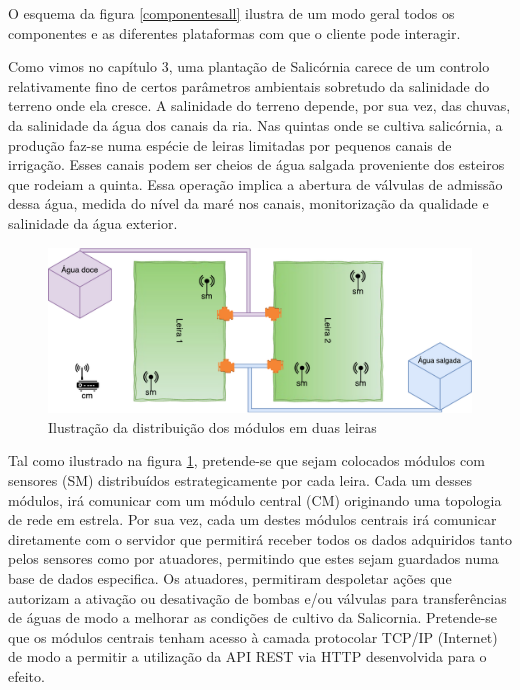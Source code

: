 O esquema da figura \ref{componentesall} ilustra de um modo geral todos os componentes e as diferentes plataformas com que o cliente pode interagir. 


Como vimos no capítulo 3, uma plantação de  Salicórnia carece de um controlo relativamente fino de certos parâmetros ambientais sobretudo da salinidade do terreno onde ela cresce. A salinidade do terreno depende, por sua vez, das chuvas, da salinidade da água dos canais da ria. Nas quintas onde se cultiva salicórnia, a produção faz-se numa espécie de leiras limitadas por pequenos canais de irrigação. Esses canais podem ser cheios de água salgada proveniente dos esteiros que rodeiam a quinta. Essa operação implica a abertura de válvulas de admissão dessa água, medida do nível da maré nos canais, monitorização da qualidade e salinidade da água exterior.



\begin{figure}[!htb]
	\centering
	\includegraphics[scale=0.63]{esquemas/leiras-comm-geral.pdf}
	\caption{Ilustração da distribuição dos módulos em duas leiras}
	\label{leira}
\end{figure}


Tal como ilustrado na figura \ref{leira}, pretende-se que sejam colocados módulos com sensores (\acl{SM}) distribuídos estrategicamente por cada leira. Cada um desses módulos, irá comunicar com um módulo central (\acl{CM}) originando uma topologia de rede em estrela.  Por sua vez, cada um destes módulos centrais irá comunicar diretamente com o servidor que permitirá receber todos os dados adquiridos tanto pelos sensores como por atuadores, permitindo que estes sejam guardados numa base de dados especifica. Os atuadores, permitiram despoletar ações que autorizam a ativação ou desativação de bombas e/ou válvulas para transferências de águas de modo a melhorar as condições de cultivo da Salicornia. 
Pretende-se que os módulos centrais tenham acesso à camada protocolar \acs{TCP}/\acs{IP} (Internet) de modo a permitir a utilização da \acs{API} \acs{REST} via \ac{HTTP} desenvolvida para o efeito. 

